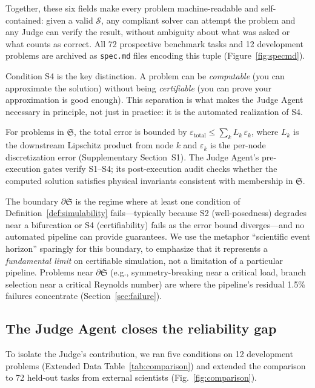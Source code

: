 \documentclass[11pt,a4paper]{article}
\newcommand{\Sclass}{\mathfrak{S}}
\newcommand{\Spec}{\mathcal{S}}
\begin{document}
\noindent Together, these six fields make every problem machine-readable and self-contained: given a valid $\Spec$, any compliant solver can attempt the problem and any Judge can verify the result, without ambiguity about what was asked or what counts as correct. All 72 prospective benchmark tasks and 12 development problems are archived as \texttt{spec.md} files encoding this tuple (Figure~\ref{fig:specmd}).

Condition S4 is the key distinction. A problem can be \emph{computable} (you can approximate the solution) without being \emph{certifiable} (you can prove your approximation is good enough). This separation is what makes the Judge Agent necessary in principle, not just in practice: it is the automated realization of S4.

For problems in $\Sclass$, the total error is bounded by $\varepsilon_{\text{total}} \leq \sum_{k} L_k \, \varepsilon_k$, where $L_k$ is the downstream Lipschitz product from node $k$ and $\varepsilon_k$ is the per-node discretization error (Supplementary Section~S1). The Judge Agent's pre-execution gates verify S1--S4; its post-execution audit checks whether the computed solution satisfies physical invariants consistent with membership in $\Sclass$.

The boundary $\partial \Sclass$ is the regime where at least one condition of Definition~\ref{def:simulability} fails---typically because S2 (well-posedness) degrades near a bifurcation or S4 (certifiability) fails as the error bound diverges---and no automated pipeline can provide guarantees. We use the metaphor ``scientific event horizon'' sparingly for this boundary, to emphasize that it represents a \emph{fundamental limit} on certifiable simulation, not a limitation of a particular pipeline. Problems near $\partial \Sclass$ (e.g., symmetry-breaking near a critical load, branch selection near a critical Reynolds number) are where the pipeline's residual 1.5\% failures concentrate (Section~\ref{sec:failure}).

\subsection{The Judge Agent closes the reliability gap}
\label{sec:gap}

To isolate the Judge's contribution, we ran five conditions on 12 development problems (Extended Data Table~\ref{tab:comparison}) and extended the comparison to 72 held-out tasks from external scientists (Fig.~\ref{fig:comparison}).
\end{document}
